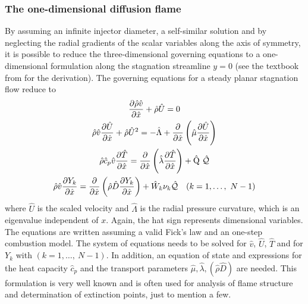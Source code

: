 \subsubsection{The one-dimensional diffusion flame}
By assuming an infinite injector diameter, a self-similar solution and by neglecting the radial gradients of the scalar variables along the axis of symmetry, it is possible to reduce the three-dimensional governing equations to a one-dimensional formulation along the stagnation streamline $y = 0$ (see the textbook from \textcite{keeChemicallyReactingFlow2003} for the derivation).  The governing equations for a steady planar stagnation flow reduce to
\begin{subequations}
\begin{gather}
	\frac{\partial\hat\rho \hat v}{\partial \hat x} +  \hat \rho \hat U = 0\label{eq:OneDimCont}\\ %
	\hat \rho \hat v \frac{\partial \hat U}{\partial \hat x} + \hat \rho \hat U^2 =
	- \hat \Lambda
	+ \frac{\partial}{\partial \hat x}\left(\hat \mu \frac{\partial \hat U}{\partial \hat x}\right)\label{eq:OneDimMom}\\ %
	\hat\rho \hat c_p \hat v \frac{\partial \hat T}{\partial\hat x} =
	\frac{\partial}{\partial \hat x}\left( \hat \lambda \frac{\partial \hat T}{\partial \hat x}\right)
	+\hat\heatRelease~\hat{\mathcal{Q}}\label{eq:OneDimTemp}\\
	\hat\rho \hat v \frac{\partial Y_k}{\partial \hat x} = 
	\frac{\partial}{\partial \hat x}\left(\hat \rho \hat D \frac{\partial Y_k}{\partial \hat x}\right)
	+ \hat W_k \stoicCoef_k \hat{\mathcal{Q}} \quad (k = 1, \dots,~N - 1) \label{eq:OneDimMF}
\end{gather}\label{eqs:OneDimEquations}%
\end{subequations}
where $\hat U$ is the scaled velocity and $\hat \Lambda$ is the radial pressure curvature, which is an eigenvalue independent of $x$. Again, the hat sign represents dimensional variables. The equations are written assuming a valid Fick's law and an one-step combustion model. The system of equations needs to be solved for $\hat v$, $\hat U$, $\hat T$ and for $Y_k$ with $ (k = 1, \dots,~N - 1)$.  In addition, an equation of state and expressions for the heat capacity $\hat c_p$ and the transport parameters $\hat \mu, \hat \lambda, (\hat \rho \hat D)$ are needed. This formulation is very well known and is often used for analysis of flame structure and determination of extinction points, just to mention a few.

